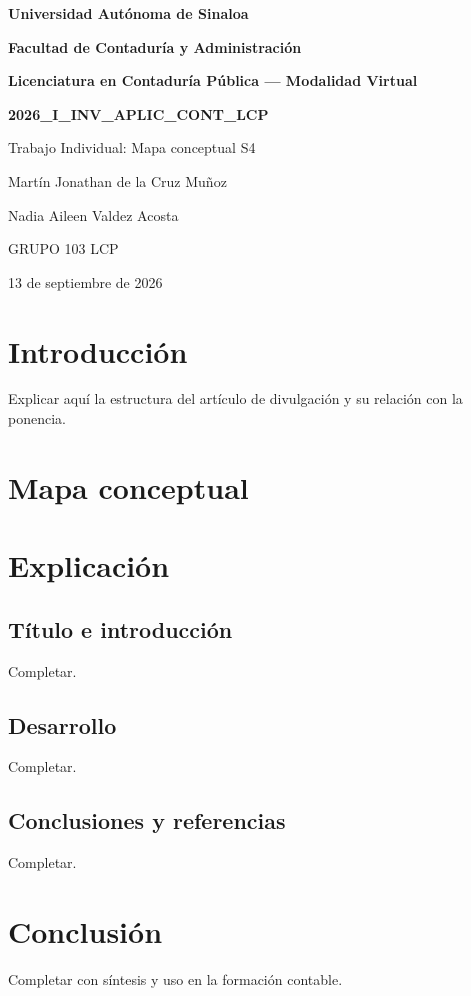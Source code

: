 \documentclass[12pt,letterpaper,oneside]{article}
\begin{document}
\begin{center}
{\bfseries Universidad Autónoma de Sinaloa}\par
{\bfseries Facultad de Contaduría y Administración}\par
{\bfseries Licenciatura en Contaduría Pública — Modalidad Virtual}\par
\vspace{.5cm}
{\Large\bfseries 2026_I_INV_APLIC_CONT_LCP}\par
{\large Trabajo Individual: Mapa conceptual S4}\par
\vspace{.5cm}
Martín Jonathan de la Cruz Muñoz\par
Nadia Aileen Valdez Acosta\par
GRUPO 103 LCP\par
13 de septiembre de 2026
\end{center}

\section{Introducción}
Explicar aquí la estructura del artículo de divulgación y su relación con la ponencia.

\section{Mapa conceptual}

\section{Explicación}
\subsection{Título e introducción}
Completar.

\subsection{Desarrollo}
Completar.

\subsection{Conclusiones y referencias}
Completar.

\section{Conclusión}
Completar con síntesis y uso en la formación contable.



\end{document}
